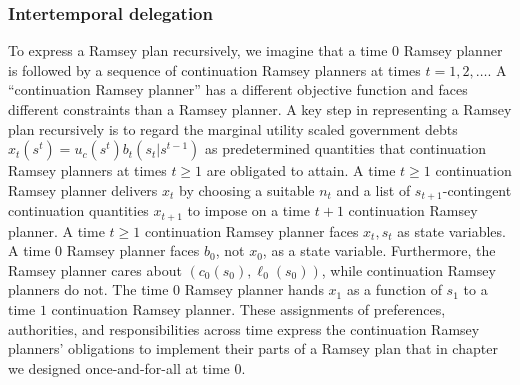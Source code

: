 %




\subsubsection{Intertemporal delegation}
  To express a Ramsey plan recursively,
we  imagine that  a time $0$ Ramsey planner is followed by a sequence of continuation Ramsey planners at times
$t = 1, 2, \ldots$. A ``continuation Ramsey planner''  has a different objective function and faces
different constraints than a Ramsey planner.
A key step in representing a Ramsey plan recursively is
 to regard the marginal utility scaled government debts $x_t(s^t) = u_c(s^t) b_t(s_t|s^{t-1})$  as  predetermined quantities
 that   continuation Ramsey planners at times $t \geq 1$ are obligated to attain.
 A time $t\geq 1$ continuation Ramsey planner  delivers $x_t$  by choosing a suitable $n_t$ and a list of $s_{t+1}$-contingent
continuation quantities $x_{t+1}$ to impose on   a time $t+1$ continuation Ramsey planner. A time $t \geq 1$ continuation Ramsey
planner faces $x_t, s_t$ as state variables.
A time $0$ Ramsey planner faces $b_0$,
not $x_0$, as a state variable. Furthermore,  the Ramsey planner cares about $(c_0(s_0), \ell_0(s_0))$, while continuation Ramsey planners do not.
The time $0$ Ramsey planner hands $x_1$ as a function of $s_1$  to a time
$1$ continuation Ramsey planner.
These assignments of  preferences, authorities, and responsibilities across time    express the continuation Ramsey planners' obligations to
implement their parts of  a  Ramsey plan that in chapter   we  designed  once-and-for-all  at time $0$.





